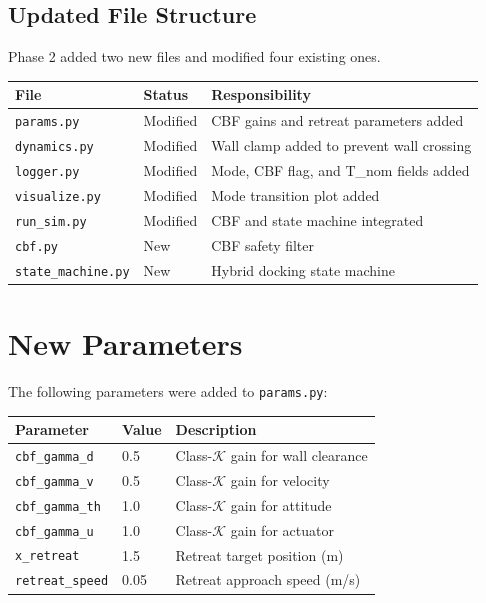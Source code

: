 \documentclass[12pt]{article}
\begin{document}
\subsection{Updated File Structure}

Phase 2 added two new files and modified four existing ones.

\begin{center}
\begin{tabular}{lll}
\toprule
\textbf{File} & \textbf{Status} & \textbf{Responsibility} \\
\midrule
\texttt{params.py}         & Modified & CBF gains and retreat parameters added \\
\texttt{dynamics.py}       & Modified & Wall clamp added to prevent wall crossing \\
\texttt{logger.py}         & Modified & Mode, CBF flag, and T\_nom fields added \\
\texttt{visualize.py}      & Modified & Mode transition plot added \\
\texttt{run\_sim.py}       & Modified & CBF and state machine integrated \\
\texttt{cbf.py}            & New      & CBF safety filter \\
\texttt{state\_machine.py} & New      & Hybrid docking state machine \\
\bottomrule
\end{tabular}
\end{center}

\section{New Parameters}

The following parameters were added to \texttt{params.py}:

\begin{center}
\begin{tabular}{lll}
\toprule
\textbf{Parameter} & \textbf{Value} & \textbf{Description} \\
\midrule
\texttt{cbf\_gamma\_d}  & 0.5  & Class-$\mathcal{K}$ gain for wall clearance \\
\texttt{cbf\_gamma\_v}  & 0.5  & Class-$\mathcal{K}$ gain for velocity \\
\texttt{cbf\_gamma\_th} & 1.0  & Class-$\mathcal{K}$ gain for attitude \\
\texttt{cbf\_gamma\_u}  & 1.0  & Class-$\mathcal{K}$ gain for actuator \\
\texttt{x\_retreat}     & 1.5  & Retreat target position (m) \\
\texttt{retreat\_speed} & 0.05 & Retreat approach speed (m/s) \\
\bottomrule
\end{tabular}
\end{center}
\end{document}
